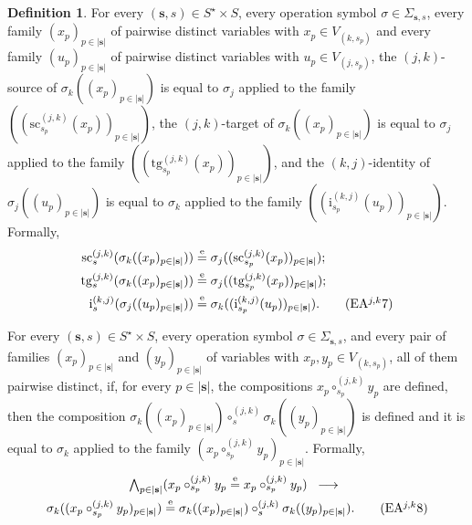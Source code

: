 \documentclass[a4paper, reqno]{amsbook}
\newcommand{\eeq}{\overset{\mathrm e}{=}}      %
\newcommand{\src}{\mathrm{sc}}
\newcommand{\tgt}{\mathrm{tg}}
\theoremstyle{plain}
\theoremstyle{definition}
\newtheorem{definition}[theorem]{Definition}
\begin{document}
\begin{definition}
For every $(\mathbf{s},s)\in S^{\star}\times S$, every operation symbol $\sigma\in \Sigma_{\mathbf{s},s}$, every family $(x_{p})_{p\in \lvert\mathbf{s}\rvert}$ of pairwise distinct variables with $x_{p}\in V_{(k,s_{p})}$ and every family $(u_{p})_{p\in \lvert\mathbf{s}\rvert}$ of pairwise distinct variables with $u_{p}\in V_{(j,s_{p})}$, the $(j,k)$-source of $\sigma_{k}((x_{p})_{p\in \lvert\mathbf{s}\rvert})$ is equal to $\sigma_{j}$ applied to the family $((\src^{(j,k)}_{s_{p}}(x_{p}))_{p\in \lvert\mathbf{s}\rvert})$, the $(j,k)$-target of $\sigma_{k}((x_{p})_{p\in \lvert\mathbf{s}\rvert})$ is equal to $\sigma_{j}$ applied to the family $((\tgt^{(j,k)}_{s_{p}}(x_{p}))_{p\in \lvert\mathbf{s}\rvert})$, and the $(k,j)$-identity of $\sigma_{j}((u_{p})_{p\in \lvert\mathbf{s}\rvert})$ is equal to $\sigma_{k}$ applied to the family $((\mathrm{i}^{(k,j)}_{s_{p}}(u_{p}))_{p\in \lvert\mathbf{s}\rvert})$.
Formally,
\begin{align*}
\src^{(j,k)}_{s}(\sigma_{k}((x_{p})_{p\in \lvert\mathbf{s}\rvert}))&\eeq\sigma_{j}((\src^{(j,k)}_{s_{p}}(x_{p}))_{p\in \lvert\mathbf{s}\rvert});\\
\tgt^{(j,k)}_{s}(\sigma_{k}((x_{p})_{p\in \lvert\mathbf{s}\rvert}))&\eeq\sigma_{j}((\tgt^{(j,k)}_{s_{p}}(x_{p}))_{p\in \lvert\mathbf{s}\rvert});\\
\mathrm{i}^{(k,j)}_{s}(\sigma_{j}((u_{p})_{p\in \lvert\mathbf{s}\rvert}))&\eeq\sigma_{k}((\mathrm{i}^{(k,j)}_{s_{p}}(u_{p}))_{p\in \lvert\mathbf{s}\rvert}).\label{ACatHtgEAjk7}\tag{EA$^{j,k}$7}
\end{align*}

For every $(\mathbf{s},s)\in S^{\star}\times S$, every operation symbol $\sigma\in \Sigma_{\mathbf{s},s}$, and every pair of families $(x_{p})_{p\in \lvert\mathbf{s}\rvert}$ and $(y_{p})_{p\in \lvert\mathbf{s}\rvert}$ of variables with $x_{p},y_{p}\in V_{(k,s_{p})}$, all of them pairwise distinct, if, for every $p\in \lvert\mathbf{s}\rvert$, the compositions $x_{p}\circ^{(j,k)}_{s_{p}}y_{p}$ are defined, then the composition $\sigma_{k}((x_{p})_{p\in \lvert\mathbf{s}\rvert})\circ^{(j,k)}_{s}\sigma_{k}((y_{p})_{p\in \lvert\mathbf{s}\rvert})$ is defined and it is equal to $\sigma_{k}$ applied to the family $(x_{p}\circ^{(j,k)}_{s_{p}}y_{p})_{p\in \lvert\mathbf{s}\rvert}$.
Formally,
\begin{multline*}
\textstyle
\bigwedge_{p\in \lvert\mathbf{s}\rvert}
(x_{p}\circ^{(j,k)}_{s_{p}} y_{p}\eeq x_{p}\circ^{(j,k)}_{s_{p}} y_{p})
\;\;\longrightarrow\;\;\\
\sigma_{k}((x_{p}\circ^{(j,k)}_{s_{p}}y_{p})_{p\in \lvert\mathbf{s}\rvert})
\eeq
\sigma_{k}((x_{p})_{p\in \lvert\mathbf{s}\rvert})\circ^{(j,k)}_{s}\sigma_{k}((y_{p})_{p\in \lvert\mathbf{s}\rvert}).
\label{ACatHtgEAjk8}\tag{EA$^{j,k}$8}
\end{multline*}


\end{definition}
\end{document}
